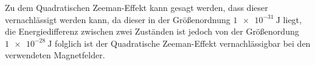 Zu dem Quadratischen Zeeman-Effekt kann gesagt werden, dass dieser
vernachlässigt werden kann, da dieser in der Größenordnung $\SI{1e-31}{\joule}$
liegt, die Energiedifferenz zwischen zwei Zuständen ist jedoch von der Größenordung
$\SI{1e-28}{\joule}$
folglich  ist der Quadratische Zeeman-Effekt vernachlässigbar bei den verwendeten Magnetfelder.
